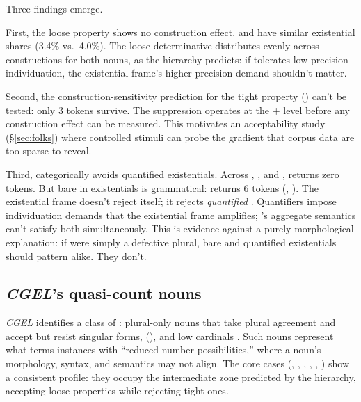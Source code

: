 \documentclass[12pt,a4paper]{article}
\begin{document}
Three findings emerge.

First, the loose property shows no construction effect.  and  have similar existential shares (3.4\% vs.\ 4.0\%). The loose determinative distributes evenly across constructions for both nouns, as the hierarchy predicts: if  tolerates low-precision individuation, the existential frame's higher precision demand shouldn't matter.

Second, the construction-sensitivity prediction for the tight property () can't be tested: only 3 tokens survive. The suppression operates at the  +  level before any construction effect can be measured. This motivates an acceptability study (\S\ref{sec:folks}) where controlled stimuli can probe the gradient that corpus data are too sparse to reveal.

Third,  categorically avoids quantified existentials. Across , , and ,  returns zero tokens. But bare  in existentials is grammatical:  returns 6 tokens (, ). The existential frame doesn't reject  itself; it rejects \textit{quantified} . Quantifiers impose individuation demands that the existential frame amplifies; 's aggregate semantics can't satisfy both simultaneously. This is evidence against a purely morphological explanation: if  were simply a defective plural, bare and quantified existentials should pattern alike. They don't.

\subsection{\textit{CGEL}'s quasi-count nouns}\label{sec:cgel}

\textit{CGEL} identifies a class of : plural-only nouns that take plural agreement and accept  but resist singular forms, (), and low cardinals \citep[p.~345]{huddleston2002}. Such nouns represent what \textcite{corbett2019} terms instances with \enquote{reduced number possibilities,} where a noun's morphology, syntax, and semantics may not align. The core cases (, , , , , ) show a consistent profile: they occupy the intermediate zone predicted by the hierarchy, accepting loose properties while rejecting tight ones.
\end{document}
